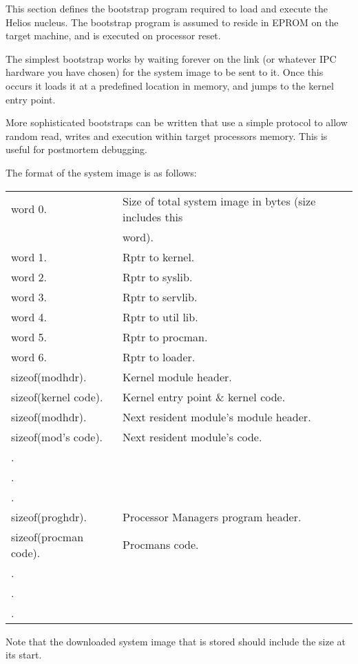 This section defines the bootstrap program required to load and execute
the Helios nucleus. The bootstrap program is assumed to reside in EPROM
on the target machine, and is executed on processor reset.

The simplest bootstrap works by waiting forever on the link
(or whatever IPC hardware you have chosen)
for the system image to be sent to it.
Once this occurs it loads it at a predefined location in memory,
and jumps to the kernel entry point.

More sophisticated bootstraps can be written that use a simple protocol
to allow random read, writes and execution within target processors memory.
This is useful for postmortem debugging.

The format of the system image is as follows:
\vfill
\newpage

\scriptsize
\begin{table}[t]
\begin{tabular}{ll}
word 0. & Size of total system image in bytes (size includes this\\
        & word).\\
word 1. & Rptr to kernel.\\
word 2. & Rptr to syslib.\\
word 3. & Rptr to servlib.\\
word 4. & Rptr to util lib.\\
word 5. & Rptr to procman.\\
word 6. & Rptr to loader.\\
sizeof(modhdr). & Kernel module header.\\
sizeof(kernel code). & Kernel entry point \& kernel code.\\
sizeof(modhdr). & Next resident module's module header.\\
sizeof(mod's code). & Next resident module's code.\\
. & \\
. & \\
. & \\
sizeof(proghdr). & Processor Managers program header.\\
sizeof(procman code). & Procmans code.\\
. & \\
. & \\
. & \\
\end{tabular}
\end{table}
\normalsize

Note that the downloaded system image that is stored should include the
size at its start.

